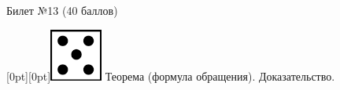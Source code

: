 \documentclass[10pt]{article}
\begin{document}
\thispagestyle{empty}

\topskip=0pt

\vspace*{\fill}

\begin{center} {\Large Билет №13 (40 баллов)} \end{center}

\raisebox{-1pt}[0pt][0pt]{\includegraphics[width=0.02\linewidth]{5.png}} Теорема (формула обращения). Доказательство. \\









\vspace*{\fill}
\end{document}
